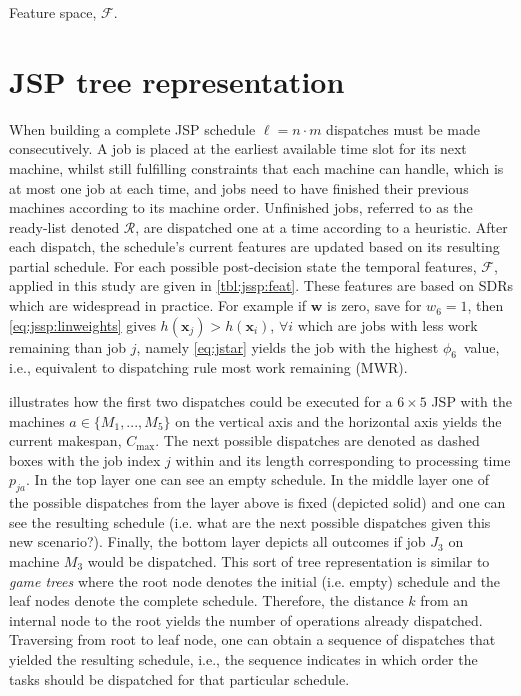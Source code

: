 \documentclass[smallextended]{llncs}
\renewcommand{\vec}[1]{\mathbf{#1}}
\newcommand{\phiwrmJob}{$\phi_6$}
\begin{document}
\begin{table}[t]  \centering
  \caption{Feature space, $\mathcal{F}$.}
  \label{tbl:jssp:feat}
  
\end{table}

\section{JSP tree representation}\label{sec:gametree}
When building a complete JSP schedule $\ell=n\cdot m$ dispatches must be made consecutively. 
A job is placed at the earliest available time slot for its next machine, whilst still fulfilling constraints that each machine can handle, which is at most one job at each time, and jobs need to have finished their previous machines according to its machine order. 
Unfinished jobs, referred to as the ready-list denoted $\mathcal{R}$, are dispatched one at a time according to a heuristic. After each dispatch, the schedule's current features are updated based on its resulting partial schedule. 
For each possible post-decision state the temporal features, $\mathcal{F}$, applied in this study are given in \cref{tbl:jssp:feat}. These features are based on SDRs which are widespread in practice. For example if $\vec{w}$ is zero, save for $w_6=1$, then \cref{eq:jssp:linweights} gives $h(\vec{x}_j)>h(\vec{x}_i)$, 
$\forall i$ which are jobs with less work remaining than job $j$, namely \cref{eq:jstar} yields the job with the highest \phiwrmJob\ value, 
i.e., equivalent to dispatching rule most work remaining (MWR).


 illustrates how the first two dispatches could be executed for a $6\times 5$ JSP with the machines $a\in\{M_1,...,M_5\}$ on the vertical axis and the horizontal axis yields the current makespan, $C_{\max}$. The next possible dispatches are denoted as dashed boxes with the job index $j$ within and its length corresponding to processing time $p_{ja}$.
In the top layer one can see an empty schedule.
In the middle layer one of the possible dispatches from the layer above is fixed (depicted solid) and one can see the resulting 
schedule (i.e. what are the next possible dispatches given this new scenario?). 
Finally, the bottom layer depicts all outcomes if job $J_3$ on machine $M_3$ would be dispatched. 
This sort of tree representation is similar 
to \emph{game trees} \cite{vonNeumann44} where the root node denotes the initial (i.e. empty) schedule and the leaf nodes 
denote the complete schedule. Therefore, the distance $k$ from an internal node to the root yields the number of 
operations already dispatched. Traversing from root to leaf node, one can obtain a sequence of dispatches that yielded 
the resulting schedule, i.e., the sequence indicates in which order the tasks should be dispatched for that particular 
schedule. 
\end{document}
